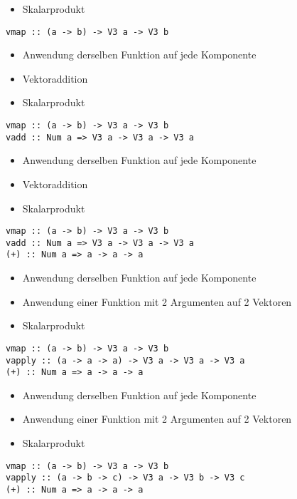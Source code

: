 \documentclass{beamer}
\begin{document}
\begin{frame}[fragile]
\begin{overprint}
\begin{itemize}
 \item Skalarprodukt
\end{itemize}
\begin{verbatim}
vmap :: (a -> b) -> V3 a -> V3 b
\end{verbatim}
\begin{itemize}
 \item Anwendung derselben Funktion auf jede Komponente
 \item Vektoraddition
 \item Skalarprodukt
\end{itemize}
\begin{verbatim}
vmap :: (a -> b) -> V3 a -> V3 b
vadd :: Num a => V3 a -> V3 a -> V3 a
\end{verbatim}
\begin{itemize}
 \item Anwendung derselben Funktion auf jede Komponente
 \item Vektoraddition
 \item Skalarprodukt
\end{itemize}
\begin{verbatim}
vmap :: (a -> b) -> V3 a -> V3 b
vadd :: Num a => V3 a -> V3 a -> V3 a
(+) :: Num a => a -> a -> a
\end{verbatim}
\begin{itemize}
 \item Anwendung derselben Funktion auf jede Komponente
 \item Anwendung einer Funktion mit 2 Argumenten auf 2 Vektoren
 \item Skalarprodukt
\end{itemize}
\begin{verbatim}
vmap :: (a -> b) -> V3 a -> V3 b
vapply :: (a -> a -> a) -> V3 a -> V3 a -> V3 a
(+) :: Num a => a -> a -> a
\end{verbatim}
\begin{itemize}
 \item Anwendung derselben Funktion auf jede Komponente
 \item Anwendung einer Funktion mit 2 Argumenten auf 2 Vektoren
 \item Skalarprodukt
\end{itemize}
\begin{verbatim}
vmap :: (a -> b) -> V3 a -> V3 b
vapply :: (a -> b -> c) -> V3 a -> V3 b -> V3 c
(+) :: Num a => a -> a -> a
\end{verbatim}
\begin{itemize}

\end{itemize}
\end{overprint}
\end{frame}
\end{document}
